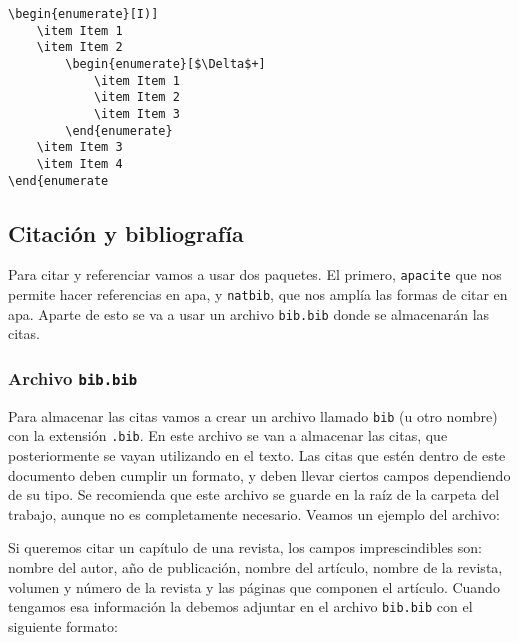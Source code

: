 	\begin{myquote}
		\begin{lstlisting}
\begin{enumerate}[I)]
	\item Item 1
	\item Item 2
		\begin{enumerate}[$\Delta$+]
			\item Item 1
			\item Item 2
			\item Item 3
		\end{enumerate}
	\item Item 3
	\item Item 4
\end{enumerate
		\end{lstlisting}
	\end{myquote}
	
	\subsection{Citación y bibliografía}
	
	Para citar y referenciar  vamos a usar dos paquetes. El primero, \texttt{apacite} que nos permite hacer referencias en apa, y \texttt{natbib}, que nos amplía las formas de citar en apa. Aparte de esto se va a usar un archivo \texttt{bib.bib} donde se almacenarán las citas.
	
	\subsubsection{Archivo \texttt{bib.bib}}
	
	Para almacenar las citas vamos a crear un archivo llamado \texttt{bib} (u otro nombre) con la extensión \texttt{.bib}. En este archivo se van a almacenar las citas, que posteriormente se vayan utilizando en el texto. Las citas que estén dentro de este documento deben cumplir un formato, y deben llevar ciertos campos dependiendo de su tipo. Se recomienda que este archivo se guarde en la raíz de la carpeta del trabajo, aunque no es completamente necesario. Veamos un ejemplo del archivo:
	
	Si queremos citar un capítulo de una revista, los campos imprescindibles son: nombre del autor, año de publicación, nombre del artículo, nombre de la revista, volumen y número de la revista y las páginas que componen el artículo. Cuando tengamos esa información la debemos adjuntar en el archivo \texttt{bib.bib} con el siguiente formato:
	
